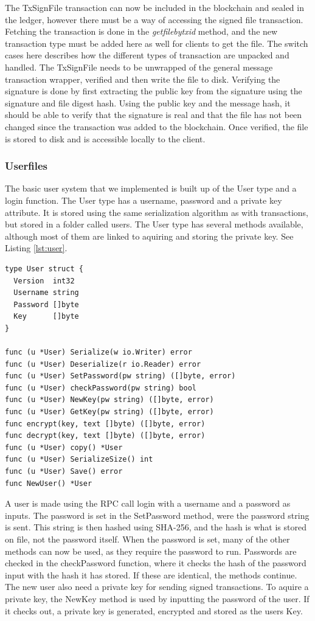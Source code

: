\documentclass[12pt]{article}
\begin{document}
The TxSignFile transaction can now be included in the blockchain and sealed in the ledger, however there must be a way of accessing the signed file transaction. Fetching the transaction is done in the \textit{getfilebytxid} method, and the new transaction type must be added here as well for clients to get the file. The switch cases here describes how the different types of transaction are unpacked and handled. The TxSignFile needs to be unwrapped of the general message transaction wrapper, verified and then write the file to disk. Verifying the signature is done by first extracting the public key from the signature using the signature and file digest hash. Using the public key and the message hash, it should be able to verify that the signature is real and that the file has not been changed since the transaction was added to the blockchain. Once verified, the file is stored to disk and is accessible locally to the client. 

\subsubsection{Userfiles}\label{subsec:userfiles}
The basic user system that we implemented is built up of the User type and a login function. The User type has a username, password and a private key attribute. It is stored using the same serialization algorithm as with transactions, but stored in a folder called users. The User type has several methods available, although most of them are linked to aquiring and storing the private key. See Listing \ref{lst:user}.

\begin{lstlisting}[float=h!,caption={User},label=lst:user]
type User struct {
  Version  int32
  Username string
  Password []byte
  Key      []byte
}

func (u *User) Serialize(w io.Writer) error 
func (u *User) Deserialize(r io.Reader) error 
func (u *User) SetPassword(pw string) ([]byte, error) 
func (u *User) checkPassword(pw string) bool 
func (u *User) NewKey(pw string) ([]byte, error)
func (u *User) GetKey(pw string) ([]byte, error) 
func encrypt(key, text []byte) ([]byte, error) 
func decrypt(key, text []byte) ([]byte, error) 
func (u *User) copy() *User 
func (u *User) SerializeSize() int 
func (u *User) Save() error 
func NewUser() *User 
\end{lstlisting}

A user is made using the RPC call login with a username and a password as inputs. The password is set in the SetPassword method, were the password string is sent. This string is then hashed using SHA-256, and the hash is what is stored on file, not the password itself. When the password is set, many of the other methods can now be used, as they require the password to run. Passwords are checked in the checkPassword function, where it checks the hash of the password input with the hash it has stored. If these are identical, the methods continue. The new user also need a private key for sending signed transactions. To aquire a private key, the NewKey method is used by inputting the password of the user. If it checks out, a private key is generated, encrypted and stored as the users Key. 
\end{document}
